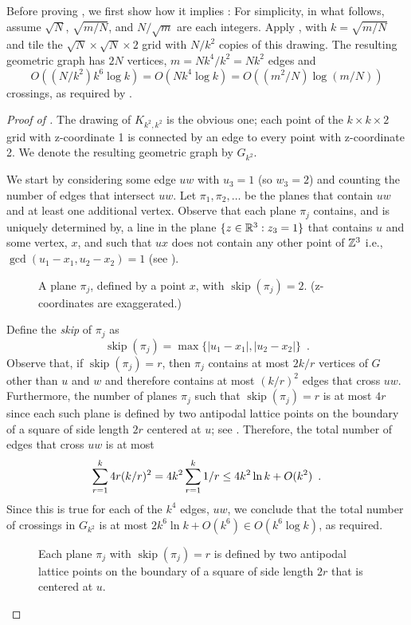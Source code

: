 \documentclass{patmorin}
\newcommand{\n}{N}
\DeclareMathOperator{\skp}{skip}
\begin{document}
Before proving , we first show how it implies
: For simplicity, in what follows, assume
$\sqrt{\n}$, $\sqrt{m/\n}$, and $\n/\sqrt{m}$ are each integers.
Apply , with $k=\sqrt{m/\n}$ and tile the
$\sqrt{\n}\times\sqrt{\n}\times 2$ grid with $\n/k^2$ copies of
this drawing. The resulting geometric graph has $2\n$ vertices,
$m=\n k^4/k^2=\n k^2$ edges and
\[ 
   O((\n/k^2)k^6\log k) = O(\n k^4\log k) = O((m^2/\n)\log(m/\n))
\] 
crossings, as required by .

\begin{proof}[Proof of ]
  The drawing of $K_{k^2,k^2}$ is the obvious one; each point of the
  $k\times k\times2$ grid with z-coordinate 1 is connected by an edge
  to every point with z-coordinate 2.  We denote the resulting
  geometric graph by $G_{k^2}$.

  We start by considering some edge $uw$ with $u_3=1$ (so
  $w_3=2$) and counting the number of edges that intersect $uw$.
  Let $\pi_1,\pi_2,\ldots$ be the planes that contain $uw$ and at least
  one additional vertex.  Observe that each plane $\pi_j$ contains, and
  is uniquely determined by, a line in the plane $\{z\in\mathbb{R}^3: z_3=1\}$
  that contains $u$ and some vertex, $x$, and such that $ux$ does not
  contain any other point of $\mathbb{Z}^3$ i.e.,
  $\gcd(u_1-x_1,u_2-x_2)=1$ (see ).
  \begin{figure}
    \caption{A plane $\pi_j$, defined by a point $x$, with
      $\skp(\pi_j)=2$. (z-coordinates are exaggerated.)}
  \end{figure}
  Define the \emph{skip} of $\pi_j$ as
  \[
     \skp(\pi_j)=\max\{|u_1-x_1|,|u_2-x_2|\} \enspace .
  \]
  Observe that, if $\skp(\pi_j)=r$, then $\pi_j$ contains at most $2k/r$
  vertices of $G$ other than $u$ and $w$ and therefore contains at most
  $(k/r)^2$ edges that cross $uw$.  Furthermore, the number of planes
  $\pi_j$ such that $\skp(\pi_j)=r$ is at most $4r$ since each such
  plane is defined by two antipodal lattice points on the boundary of a
  square of side length $2r$ centered at $u$; see .
  Therefore, the total number of edges that cross $uw$ is at most
  \begin{equation}
     \sum_{r=1}^k 4r(k/r)^2 = 4k^2\sum_{r=1}^k 1/r 
       \le 4k^2\ln k + O(k^2) \enspace .
        \eqlabel{critical}
  \end{equation}
  Since this is true for each of the $k^4$ edges, $uw$, we conclude
  that the total number of crossings in $G_{k^2}$ is at most $2k^6\ln
  k+O(k^6)\in O(k^6\log k)$, as required.
  \begin{figure}
    \caption{Each plane $\pi_j$ with $\skp(\pi_j)=r$ is defined by two
      antipodal lattice points on the boundary of a square of side length
      $2r$ that is centered at $u$.}
  \end{figure}
\end{proof}
\end{document}

